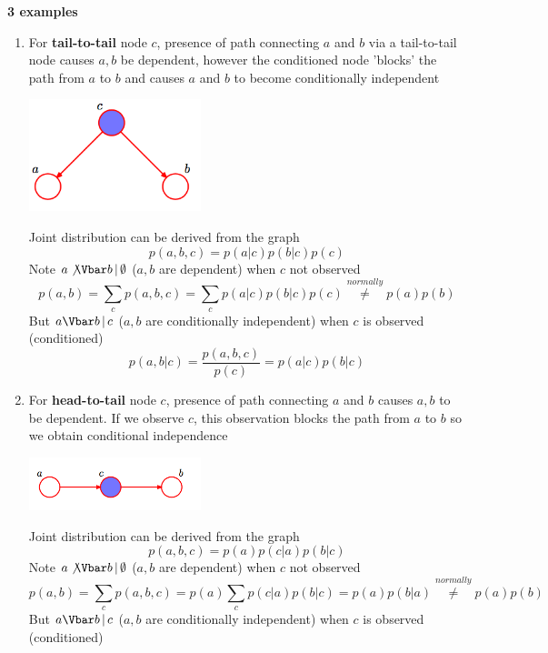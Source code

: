 \documentclass[11pt]{article}
\begin{document}
\begin{defn*}
    \textbf{3 examples}
    \begin{enumerate}
        \item For \textbf{tail-to-tail} node $c$, presence of path connecting $a$ and $b$ via a tail-to-tail node causes $a,b$ be dependent, however the conditioned node 'blocks' the path from $a$ to $b$ and causes $a$ and $b$ to become conditionally independent
        \begin{center}
            \includegraphics[width=5cm]{example1.png}
        \end{center}
        Joint distribution can be derived from the graph 
        \[
            p(a,b,c) = p(a|c)p(b|c)p(c)
        \]
        Note $\notcondi{a}{b}{\emptyset}$ ($a,b$ are dependent) when $c$ not observed
        \[
            p(a,b) = \sum_c p(a,b,c) = \sum_c p(a|c)p(b|c)p(c) 
            \overset{normally}{\neq} p(a)p(b)
        \]
        But $\condi{a}{b}{c}$ ($a,b$ are conditionally independent) when $c$ is observed (conditioned)
        \[
            p(a,b|c) = \frac{p(a,b,c)}{p(c)} = p(a|c)p(b|c)
        \]
        \item For \textbf{head-to-tail} node $c$, presence of path connecting $a$ and $b$ causes $a,b$ to be dependent. If we observe $c$, this observation blocks the path from $a$ to $b$ so we obtain conditional independence 
        \begin{center}
            \includegraphics[width=5cm]{example2.png}
        \end{center}
        Joint distribution can be derived from the graph 
        \[
            p(a,b,c) = p(a)p(c|a)p(b|c)
        \]
        Note $\notcondi{a}{b}{\emptyset}$ ($a,b$ are dependent) when $c$ not observed
        \[
            p(a,b) = \sum_c p(a,b,c) = p(a) \sum_c p(c|a)p(b|c) = p(a)p(b|a)
            \overset{normally}{\neq} p(a)p(b)
        \]
        But $\condi{a}{b}{c}$ ($a,b$ are conditionally independent) when $c$ is observed (conditioned)

\end{enumerate}
\end{defn*}
\end{document}
